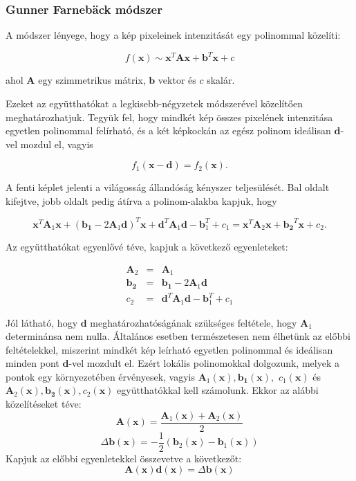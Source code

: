 \subsubsection{Gunner Farnebäck módszer \cite{farneback}}

A módszer lényege, hogy a kép pixeleinek intenzitását egy polinommal közelíti:

\[f(\mathbf{x}) \sim \mathbf{x}^T \mathbf{A} \mathbf{x} + \mathbf{b}^T \mathbf{x} + c\]

ahol $\mathbf{A}$ egy szimmetrikus mátrix, $\mathbf{b}$ vektor és $c$ skalár.

Ezeket az együtthatókat a legkisebb-négyzetek módszerével közelítően meghatározhatjuk. Tegyük fel, hogy mindkét kép összes pixelének intenzitása egyetlen polinommal felírható, és a két képkockán az egész polinom ideálisan $\mathbf{d}$-vel mozdul el, vagyis

\[f_1(\mathbf{x} - \mathbf{d}) = f_2(\mathbf{x}).\]

A fenti képlet jelenti a világosság állandóság kényszer teljesülését. Bal oldalt kifejtve, jobb oldalt pedig átírva a polinom-alakba \cite{farneback} kapjuk, hogy

\[\mathbf{x}^T \mathbf{A}_1 \mathbf{x} + (\mathbf{b_1} - 2 \mathbf{A}_1\mathbf{d})^T \mathbf{x} + \mathbf{d}^T \mathbf{A}_1 \mathbf{d} -\mathbf{b}_1^T + c_1 = \mathbf{x}^T \mathbf{A}_2 \mathbf{x} + \mathbf{b_2}^T \mathbf{x} + c_2.\]

Az együtthatókat egyenlővé téve, kapjuk a következő egyenleteket:

\[\begin{array}{rcl}\mathbf{A}_2 &=& \mathbf{A}_1\\\mathbf{b_2} &=& \mathbf{b_1} - 2 \mathbf{A}_1\mathbf{d}\\ c_2 &=& \mathbf{d}^T \mathbf{A}_1 \mathbf{d} -\mathbf{b}_1^T + c_1 \end{array}\]

Jól látható, hogy $\mathbf{d}$ meghatározhatóságának szükséges feltétele, hogy $\mathbf{A}_1$ determinánsa nem nulla. Általános esetben természetesen nem élhetünk az előbbi feltételekkel, miszerint mindkét kép leírható egyetlen polinommal és ideálisan minden pont $\mathbf{d}$-vel mozdult el. Ezért lokális polinomokkal dolgozunk, melyek a pontok egy környezetében érvényesek, vagyis $\mathbf{A}_1(\mathbf{x}), \mathbf{b_1}(\mathbf{x}),$ $c_1(\mathbf{x})$ és $\mathbf{A}_2(\mathbf{x}), \mathbf{b_2}(\mathbf{x}), c_2(\mathbf{x})$ együtthatókkal kell számolunk. Ekkor az alábbi közelítéseket téve:
\[\mathbf{A}(\mathbf{x}) = \frac{\mathbf{A}_1(\mathbf{x}) + \mathbf{A}_2(\mathbf{x})}{2}\]
\[\Delta \mathbf{b}(\mathbf{x}) = -\frac{1}{2}\left(\mathbf{b}_2(\mathbf{x})-\mathbf{b}_1(\mathbf{x})\right)\]
Kapjuk az előbbi egyenletekkel összevetve a következőt:
\[\mathbf{A}(\mathbf{x})\mathbf{d}(\mathbf{x}) = \Delta \mathbf{b}(\mathbf{x})\]

